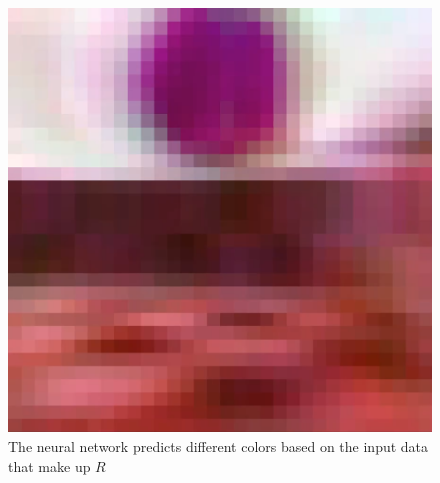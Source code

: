 \begin{figure}[p]
  \includegraphics[width=\imgWidth]{images/workflow/FunctionalF3.png}
  \caption{The neural network predicts different colors based on the input data that make up $R$}
  \label{FunctionalFirstPerson}
\end{figure}

